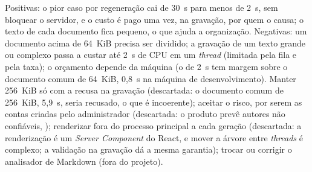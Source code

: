 {Positivas: o pior caso por regeneração cai de 30~s para menos de 2~s, sem bloquear o servidor, e o custo é pago uma vez, na gravação, por quem o causa; o texto de cada documento fica pequeno, o que ajuda a organização. Negativas: um documento acima de 64~KiB precisa ser dividido; a gravação de um texto grande ou complexo passa a custar até 2~s de CPU em um \emph{thread} (limitada pela fila e pela taxa); o orçamento depende da máquina (o de 2~s tem margem sobre o documento comum de 64~KiB, 0,8~s na máquina de desenvolvimento).}
{Manter 256~KiB só com a recusa na gravação (descartada: o documento comum de 256~KiB, 5,9~s, seria recusado, o que é incoerente); aceitar o risco, por serem as contas criadas pelo administrador (descartada: o produto prevê autores não confiáveis, ); renderizar fora do processo principal a cada geração (descartada: a renderização é um \emph{Server Component} do React, e mover a árvore entre \emph{threads} é complexo; a validação na gravação dá a mesma garantia); trocar ou corrigir o analisador de Markdown (fora do projeto).}

